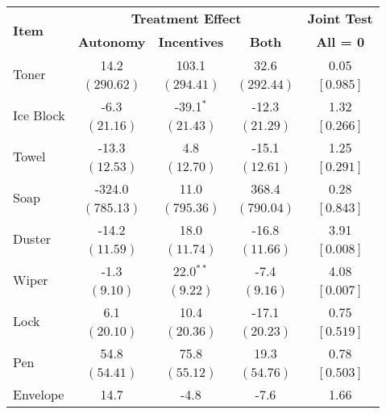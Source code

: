 \begin{tabular}{lcccc}
\toprule
\multirow{2}{*}{\textbf{Item}} & \multicolumn{3}{c}{\textbf{Treatment Effect}} & \textbf{Joint Test} \\ 
 & \textbf{Autonomy} & \textbf{Incentives} & \textbf{Both} & \textbf{All = 0} \\ 
\midrule
 \multirow{2}{*}{Toner}  &   14.2 &  103.1 &   32.6 &   0.05 \\ 
 & $ \left(290.62\right) $  & $ \left(294.41\right) $  & $ \left(292.44\right) $  & $ \left[ 0.985\right] $  \\ [0.25em] 
 \multirow{2}{*}{Ice Block}  &   -6.3 &  -39.1$^{*}$ &  -12.3 &   1.32 \\ 
 & $ \left( 21.16\right) $  & $ \left( 21.43\right) $  & $ \left( 21.29\right) $  & $ \left[ 0.266\right] $  \\ [0.25em] 
 \multirow{2}{*}{Towel}  &  -13.3 &    4.8 &  -15.1 &   1.25 \\ 
 & $ \left( 12.53\right) $  & $ \left( 12.70\right) $  & $ \left( 12.61\right) $  & $ \left[ 0.291\right] $  \\ [0.25em] 
 \multirow{2}{*}{Soap}  & -324.0 &   11.0 &  368.4 &   0.28 \\ 
 & $ \left(785.13\right) $  & $ \left(795.36\right) $  & $ \left(790.04\right) $  & $ \left[ 0.843\right] $  \\ [0.25em] 
 \multirow{2}{*}{Duster}  &  -14.2 &   18.0 &  -16.8 &   3.91 \\ 
 & $ \left( 11.59\right) $  & $ \left( 11.74\right) $  & $ \left( 11.66\right) $  & $ \left[ 0.008\right] $  \\ [0.25em] 
 \multirow{2}{*}{Wiper}  &   -1.3 &   22.0$^{**}$ &   -7.4 &   4.08 \\ 
 & $ \left(  9.10\right) $  & $ \left(  9.22\right) $  & $ \left(  9.16\right) $  & $ \left[ 0.007\right] $  \\ [0.25em] 
 \multirow{2}{*}{Lock}  &    6.1 &   10.4 &  -17.1 &   0.75 \\ 
 & $ \left( 20.10\right) $  & $ \left( 20.36\right) $  & $ \left( 20.23\right) $  & $ \left[ 0.519\right] $  \\ [0.25em] 
 \multirow{2}{*}{Pen}  &   54.8 &   75.8 &   19.3 &   0.78 \\ 
 & $ \left( 54.41\right) $  & $ \left( 55.12\right) $  & $ \left( 54.76\right) $  & $ \left[ 0.503\right] $  \\ [0.25em] 
 \multirow{2}{*}{Envelope}  &   14.7 &   -4.8 &   -7.6 &   1.66 \\ 

\end{tabular}
